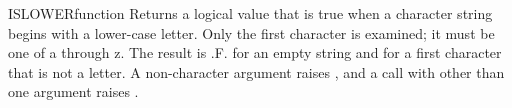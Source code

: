 \begin{XbaseEntry}{ISLOWER}{function}
Returns a logical value that is true when a character string begins with a lower-case letter.
\Syntax
{}
\Usage
Only the first character is examined; it must be one of a through z. The result is .F. for an empty string and for a first character that is not a letter. A non-character argument raises , and a call with other than one argument raises .
\Examples
{}
\end{XbaseEntry}

